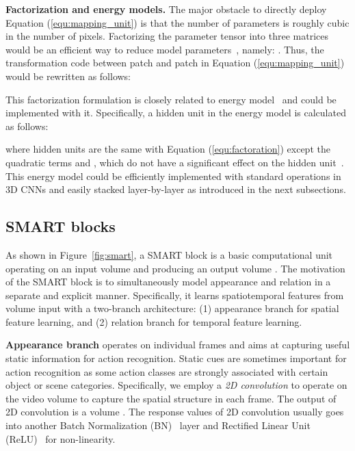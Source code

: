 \documentclass[10pt,twocolumn,letterpaper]{article}
\begin{document}
{\bf Factorization and energy models.} The major obstacle to directly deploy Equation (\ref{equ:mapping_unit}) is that the number of parameters is roughly cubic in the number of pixels. Factorizing the parameter tensor  into three matrices would be an efficient way to reduce model parameters~\cite{Memisevic13}, namely: . Thus, the transformation code  between patch  and patch  in Equation (\ref{equ:mapping_unit}) would be rewritten as follows:

This factorization formulation is closely related to energy model~\cite{Energymodel} and could be implemented with it. Specifically, a hidden unit  in the energy model is calculated as follows:

where hidden units are the same with Equation (\ref{equ:factoration}) except the quadratic terms  and , which do not have a significant effect on the hidden unit~\cite{Memisevic12}. This energy model could be efficiently implemented with standard operations in 3D CNNs and easily stacked layer-by-layer as introduced in the next subsections.

\subsection{SMART blocks}

As shown in Figure~\ref{fig:smart}, a SMART block is a basic computational unit operating on an input volume  and producing an output volume . The motivation of the SMART block is to simultaneously model appearance and relation in a separate and explicit manner. Specifically, it learns spatiotemporal features from volume input with a two-branch architecture: (1) appearance branch for spatial feature learning, and (2) relation branch for temporal feature learning. 

{\bf Appearance branch} operates on individual frames and aims at capturing useful static information for action recognition. Static cues are sometimes important for action recognition as some action classes are strongly associated with certain object or scene categories. Specifically, we employ a {\em 2D convolution} to operate on the video volume  to capture the spatial structure in each frame. The output of 2D convolution is a volume . The response values  of 2D convolution usually goes into another Batch Normalization (BN)~\cite{IoffeS15} layer and Rectified Linear Unit (ReLU)~\cite{NairH10} for non-linearity.
\end{document}
